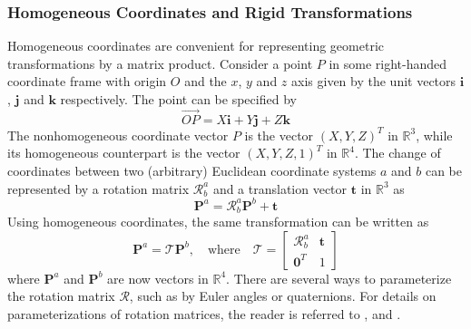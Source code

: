 \subsubsection{Homogeneous Coordinates and Rigid Transformations}
\label{section:transformations}
Homogeneous coordinates are convenient for representing geometric transformations by a matrix product.
Consider a point $P$ in some right-handed coordinate frame with origin $O$ and the $x$, $y$ and $z$ axis given by the unit vectors $\mathbf{i}$, $\mathbf{j}$ and $\mathbf{k}$ respectively. The point can be specified by
\begin{equation}
    \overrightarrow{OP}=X\mathbf{i}+Y\mathbf{j}+Z\mathbf{k}
\end{equation}
The nonhomogeneous coordinate vector $P$ is the vector $(X, Y, Z)^T$ in $\mathbb{R}^3$, while its homogeneous counterpart is the vector $(X,Y,Z,1)^T$ in $\mathbb{R}^4$. The change of coordinates between two (arbitrary) Euclidean coordinate systems $a$ and $b$ can be represented by a rotation matrix $\mathcal{R}_b^a$ and a translation vector $\mathbf{t}$ in $\mathbb{R}^3$ as
\begin{equation}
    \mathbf{P}^a=\mathcal{R}_b^a\mathbf{P}^b+\mathbf{t}
\end{equation}
Using homogeneous coordinates, the same transformation can be written as
\begin{equation}
\label{eq:homo_trans}
    \mathbf{P}^a=\mathcal{T}\mathbf{P}^b,\quad \text{where}\quad \mathcal{T}=\begin{bmatrix}\mathcal{R}_b^a & \mathbf{t} \\
    \mathbf{0}^T & 1 \end{bmatrix}
\end{equation}
where $\mathbf{P}^a$ and $\mathbf{P}^b$ are now vectors in $\mathbb{R}^4$. There are several ways to parameterize the rotation matrix $\mathcal{R}$, such as by Euler angles or quaternions. For details on parameterizations of rotation matrices, the reader is referred to \cite{modsim}, \cite{kinematics} and \cite{geometry}.
